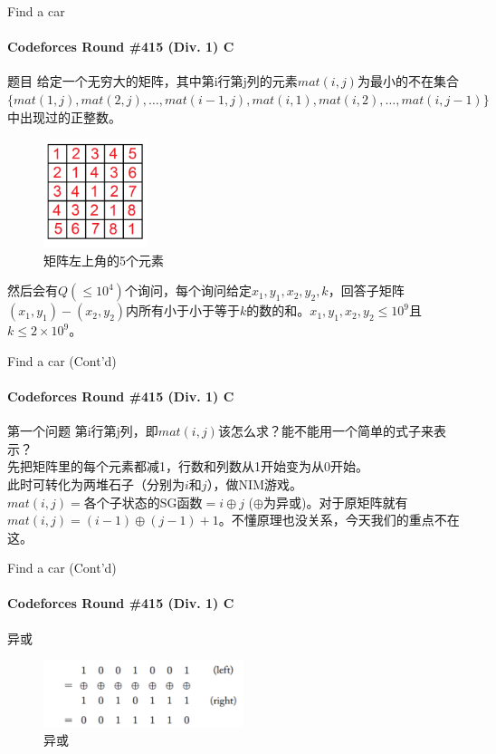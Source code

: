 \documentclass[hyperref={unicode=true}]{beamer}
\theoremstyle{definition}
\theoremstyle{proof}
\begin{document}
\begin{frame}{Find a car}\framesubtitle{Codeforces Round \#415 (Div. 1) C}
  \begin{block}{题目}
    给定一个无穷大的矩阵，其中第i行第j列的元素$mat(i,j)$为最小的不在集合$\{mat(1,j),mat(2,j),\ldots,mat(i-1,j), mat(i,1), mat(i,2), \ldots,mat(i,j-1)\}$中出现过的正整数。
    \begin{minipage}{0.45\linewidth}
      \begin{figure}
        \centering
        \includegraphics[width=1.2in]{figures/upper5.png}
        \caption{矩阵左上角的5个元素}\label{fig:upper5}
      \end{figure}
    \end{minipage}
    \begin{minipage}{0.45\linewidth}
      然后会有$Q(\leq 10^4)$个询问，每个询问给定$x_1,y_1,x_2,y_2,k$，回答子矩阵$(x_1,y_1)-(x_2,y_2)$内所有小于小于等于$k$的数的和。$x_1,y_1,x_2,y_2\leq 10^9$且$k\leq2\times 10^9$。
    \end{minipage}
  \end{block}
\end{frame}

\begin{frame}{Find a car (Cont'd)}\framesubtitle{Codeforces Round \#415 (Div. 1) C}
  \begin{alertblock}{第一个问题}
    第i行第j列，即$mat(i,j)$该怎么求？能不能用一个简单的式子来表示？\\
    \pause{}先把矩阵里的每个元素都减1，行数和列数从1开始变为从0开始。\\
    \pause{}此时可转化为两堆石子（分别为$i$和$j$），做NIM游戏。$mat(i,j)=\text{各个子状态的SG函数}=i \oplus j$ ($\oplus$为异或)。对于原矩阵就有$mat(i,j)=(i-1)\oplus (j-1) + 1$。不懂原理也没关系，今天我们的重点不在这。
  \end{alertblock}
\end{frame}

\begin{frame}{Find a car (Cont'd)}\framesubtitle{Codeforces Round \#415 (Div. 1) C}
  \begin{block}{异或}
    \begin{figure}
      \includegraphics[width=2.3in]{figures/xor.png}
      \caption{异或}\label{fig:xor}
    \end{figure}
  \end{block}
\end{frame}
\end{document}
